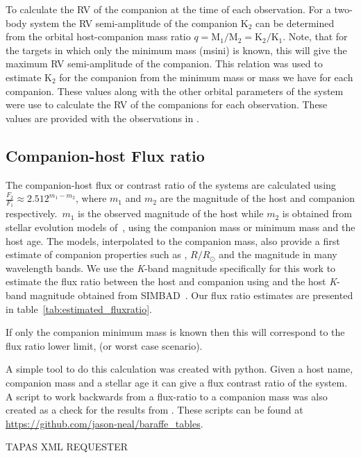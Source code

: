 To calculate the {RV} of the companion at the time of each observation. For a two-body system the {RV} semi-amplitude of the companion \(\textrm{K}_{2}\) can be determined from the orbital host-companion mass ratio $q = \textrm{M}_{1}/\textrm{M}_{2} = \textrm{K}_{2}/\textrm{K}_{1}$.
Note, that for the targets in which only the minimum mass (msini) is known, this will give the maximum {RV} semi-amplitude of the companion.
This relation was used to estimate \(\textrm{K}_2\) for the companion from the minimum mass or mass we have for each companion. These values along with the other orbital parameters of the system were use to calculate the {RV} of the companions for each observation. These values are provided with the observations in .


\subsection{Companion-host Flux ratio}
The companion-host flux or contrast ratio of the systems are calculated using \(\frac{F_{2}}{F_{1}} \approx 2.512^{m_1-m_2}\), where \(m_1\) and \(m_2\) are the magnitude of the host and companion respectively.\ \(m_1\) is the observed magnitude of the host while \(m_2\) is obtained from stellar evolution models of~\citet{baraffe_evolutionary_2003, baraffe_new_2015}, using the companion mass or minimum mass and the host age. The models, interpolated to the companion mass, also provide a first estimate of companion properties such as \teff{}, \(R/R_{\odot}\) and the magnitude in many wavelength bands.
We use the \emph{K}-band magnitude specifically for this work to estimate the flux ratio between the host and companion using and the host \emph{K}-band magnitude obtained from {SIMBAD}~\citep{wenger_simbad_2000}. Our flux ratio estimates are presented in table~\ref{tab:estimated_fluxratio}.

If only the companion minimum mass is known then this will correspond to the flux ratio lower limit, (or worst case scenario).


A simple tool to do this calculation was created with python. Given a host name, companion mass and a stellar age it can give a flux contrast ratio of the system. A script to work backwards from a flux-ratio to a companion mass was also created as a check for the results from . These scripts can be found at \url{https://github.com/jason-neal/baraffe_tables}.




{TAPAS} XML REQUESTER

